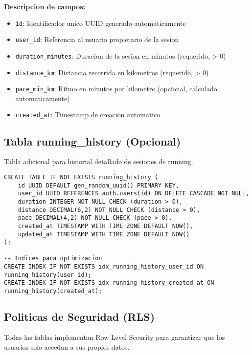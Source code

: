 \documentclass[12pt,a4paper]{article}
\begin{document}
\textbf{Descripcion de campos:}
\begin{itemize}
    \item \texttt{id}: Identificador unico UUID generado automaticamente
    \item \texttt{user\_id}: Referencia al usuario propietario de la sesion
    \item \texttt{duration\_minutes}: Duracion de la sesion en minutos (requerido, > 0)
    \item \texttt{distance\_km}: Distancia recorrida en kilometros (requerido, > 0)
    \item \texttt{pace\_min\_km}: Ritmo en minutos por kilometro (opcional, calculado automaticamente)
    \item \texttt{created\_at}: Timestamp de creacion automatico
\end{itemize}

\subsection{Tabla running\_history (Opcional)}

Tabla adicional para historial detallado de sesiones de running.

\begin{lstlisting}[style=sqlstyle, caption=Estructura de running_history]
CREATE TABLE IF NOT EXISTS running_history (
    id UUID DEFAULT gen_random_uuid() PRIMARY KEY,
    user_id UUID REFERENCES auth.users(id) ON DELETE CASCADE NOT NULL,
    duration INTEGER NOT NULL CHECK (duration > 0),
    distance DECIMAL(6,2) NOT NULL CHECK (distance > 0),
    pace DECIMAL(4,2) NOT NULL CHECK (pace > 0),
    created_at TIMESTAMP WITH TIME ZONE DEFAULT NOW(),
    updated_at TIMESTAMP WITH TIME ZONE DEFAULT NOW()
);

-- Indices para optimizacion
CREATE INDEX IF NOT EXISTS idx_running_history_user_id ON running_history(user_id);
CREATE INDEX IF NOT EXISTS idx_running_history_created_at ON running_history(created_at);
\end{lstlisting}

\subsection{Politicas de Seguridad (RLS)}

Todas las tablas implementan Row Level Security para garantizar que los usuarios solo accedan a sus propios datos.
\end{document}
